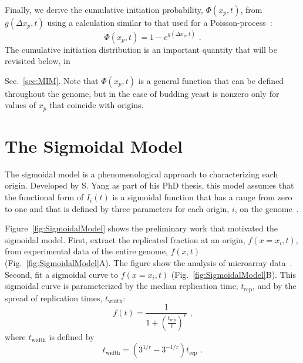 		Finally, we derive the cumulative initiation probability, $\Phi(x_p,t)$, from $g(\Delta x_p,t)$ using a calculation similar to that used for a Poisson-process~\cite{Spikes}:
		\begin{equation} \label{eq:PhiFromG}
			\Phi\left( x_p,t\right) = 1 - e^{g\left(\Delta x_p,t\right)} \text{ .}
		\end{equation}
		The cumulative initiation distribution is an important quantity that will be revisited below, in {Sec.~\ref{sec:MIM}.
		Note that $\Phi(x_p,t)$ is a general function that can be defined throughout the genome, but in the case of budding yeast is nonzero only for values of $x_p$ that coincide with origins.


	\section{The Sigmoidal Model}
	\label{sec:SigmoidalModel}
	
	The sigmoidal model is a phenomenological approach to characterizing each origin.
	Developed by S. Yang as part of his PhD thesis, this model assumes that the functional form of $I_i(t)$ is a sigmoidal function that has a range from zero to one and that is defined by three parameters for each origin, $i$, on the genome~\cite{ScottsPaper,ScottsThesis}.
	
	Figure~\ref{fig:SigmoidalModel} shows the preliminary work that motivated the sigmoidal model.
	First, extract the replicated fraction at an origin, $f(x=x_i,t)$, from experimental data of the entire genome, $f(x,t)$ (Fig.~\ref{fig:SigmoidalModel}A).
	The figure show the analysis of microarray data~\cite{McCuneMicroArray}.
	Second, fit a sigmoidal curve to $f(x=x_i,t)$ (Fig.~\ref{fig:SigmoidalModel}B).
	This sigmoidal curve is parameterized by the median replication time, $t_{\text{rep}}$, and by the spread of replication times, $t_{\text{width}}$:
	\begin{equation} \label{eq:SigmoidalModel}
		f(t) = {\frac{1}{1+\left({\frac{t_{\text{rep}}}{t}}\right)^r}}\text{ ,}
	\end{equation}
	where $t_{\text{width}}$ is defined by
	\begin{equation}
		t_{\text{width}} = \left(3^{1/r}-3^{-1/r}\right)t_{\text{rep}}\text{ .}
	\end{equation}
	
}
